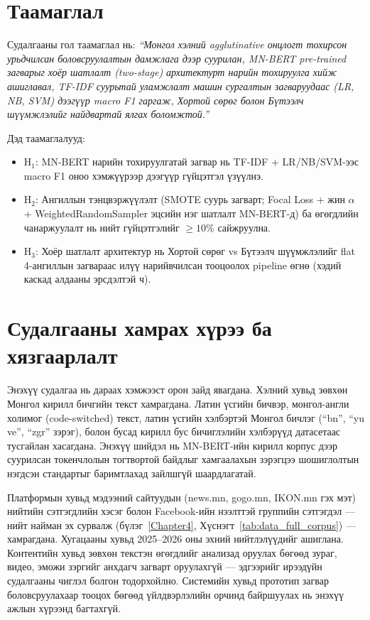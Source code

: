 \section{Таамаглал}

Судалгааны гол таамаглал нь: \textit{``Монгол хэлний agglutinative онцлогт
тохирсон урьдчилсан боловсруулалтын дамжлага дээр суурилан, MN-BERT pre-trained загварыг
хоёр шатлалт (two-stage) архитектурт нарийн тохируулга хийж ашиглавал, TF-IDF
суурьтай уламжлалт машин сургалтын загваруудаас (LR, NB, SVM)
дээгүүр macro F1 гаргаж, Хортой сөрөг болон Бүтээлч шүүмжлэлийг
найдвартай ялгах боломжтой.''}

Дэд таамаглалууд:
\begin{itemize}
  \item H$_1$: MN-BERT нарийн тохируулгатай загвар нь TF-IDF + LR/NB/SVM-ээс macro F1 оноо
    хэмжүүрээр дээгүүр гүйцэтгэл үзүүлнэ.
  \item H$_2$: Ангиллын тэнцвэржүүлэлт (SMOTE суурь загварт; Focal Loss + жин
    $\alpha$ + WeightedRandomSampler эцсийн нэг шатлалт MN-BERT-д) ба өгөгдлийн
    чанаржуулалт нь нийт гүйцэтгэлийг $\geq 10\%$ сайжруулна.
  \item H$_3$: Хоёр шатлалт архитектур нь Хортой сөрөг vs Бүтээлч шүүмжлэлийг flat
    4-ангиллын загвараас илүү нарийвчилсан тооцоолох pipeline өгнө (хэдий
    каскад алдааны эрсдэлтэй ч).
\end{itemize}

\section{Судалгааны хамрах хүрээ ба хязгаарлалт}

Энэхүү судалгаа нь дараах хэмжээст орон зайд явагдана. Хэлний хувьд зөвхөн
Монгол кирилл бичгийн текст хамрагдана. Латин үсгийн бичвэр, монгол-англи
холимог (code-switched) текст, латин үсгийн хэлбэртэй Монгол бичлэг (``bn'', ``yu ve'',
``zgr'' зэрэг), болон бусад кирилл бус бичиглэлийн хэлбэрүүд датасетаас
тусгайлан хасагдана. Энэхүү шийдэл нь MN-BERT-ийн кирилл корпус дээр суурилсан токенчлолын
тогтвортой байдлыг хамгаалахын зэрэгцээ шошиглолтын нэгдсэн стандартыг
баримтлахад зайлшгүй шаардлагатай.

Платформын хувьд мэдээний сайтуудын (news.mn, gogo.mn, IKON.mn гэх мэт) нийтийн
сэтгэгдлийн хэсэг болон Facebook-ийн нээлттэй группийн сэтгэгдэл --- нийт найман
эх сурвалж (бүлэг~\ref{Chapter4}, Хүснэгт~\ref{tab:data_full_corpus}) ---
хамрагдана. Хугацааны хувьд 2025--2026 оны эхний нийтлэлүүдийг
ашиглана. Контентийн хувьд зөвхөн текстэн өгөгдлийг анализад оруулах бөгөөд
зураг, видео, эможи зэргийг анхдагч загварт оруулахгүй --- эдгээрийг ирээдүйн
судалгааны чиглэл болгон тодорхойлно. Системийн хувьд прототип загвар
боловсруулахаар тооцох бөгөөд үйлдвэрлэлийн орчинд байршуулах нь энэхүү ажлын
хүрээнд багтахгүй.

